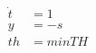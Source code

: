 \documentclass[10pt]{article}
\begin{document}
\begin{align*}
\dot{t} &= 1 \\
y &= -s \\
th &= minTH
\end{align*}
\end{document}
